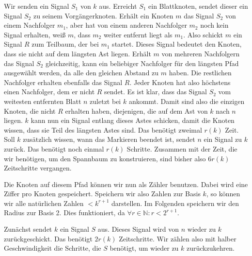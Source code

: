 \documentclass[11pt]{article}
\begin{document}
Wir senden ein Signal $S_1$ von $k$ aus. Erreicht $S_1$ ein Blattknoten, sendet dieser ein Signal $S_2$ zu seinem Vorgängerknoten. 
Erhält ein Knoten $m$ das Signal $S_2$ von einem Nachfolger $m_1$, aber hat von einem anderen Nachfolger $m_2$ noch kein Signal erhalten, weiß $m$, dass $m_2$ weiter entfernt liegt als $m_1$. 
Also schickt $m$ ein Signal $R$ zum Teilbaum, der bei $m_1$ startet. Dieses Signal bedeutet den Knoten, dass sie nicht auf dem längsten Ast liegen. 
Erhält $m$  von mehreren Nachfolgern das Signal $S_2$ gleichzeitig, kann ein beliebiger Nachfolger für den längsten Pfad ausgewählt werden, da alle den gleichen Abstand zu $m$ haben. 
Die restlichen Nachfolger erhalten ebenfalls das Signal $R$. 
Jeder Knoten hat also höchstens einen Nachfolger, dem er nicht $R$ sendet. 
Es ist klar, dass das Signal $S_2$ vom weitesten entfernten Blatt $n$ zuletzt bei $k$ ankommt. 
Damit sind also die einzigen Knoten, die nicht $R$ erhalten haben, diejenigen, die auf dem Ast von $k$ nach $n$ liegen.
$k$ kann nun ein Signal entlang dieses Astes schicken, damit die Knoten wissen, dass sie Teil des längsten Astes sind.
Das benötigt zweimal $r(k)$ Zeit. Soll $k$ zusätzlich wissen, wann das Markieren beendet ist, sendet $n$ ein Signal zu $k$ zurück. Das benötigt noch einmal $r(k)$ Schritte.
Zusammen mit der Zeit, die wir benötigen, um den Spannbaum zu konstruieren, sind bisher also $6r(k)$ Zeitschritte vergangen.

Die Knoten auf diesem Pfad können wir nun als Zähler benutzen.
Dabei wird eine Ziffer pro Knoten gespeichert. Speichern wir also Zahlen zur Basis $k$, so können wir alle natürlichen Zahlen $< k^{r+1}$ darstellen. Im Folgenden speichern wir den Radius zur Basis 2. Dies funktioniert, da $\forall r \in \mathbb{N} : r < 2^{r+1}$.

Zunächst sendet $k$ ein Signal $S$ aus. Dieses Signal wird von $n$ wieder zu $k$ zurückgeschickt. Das benötigt $2r(k)$ Zeitschritte. Wir zählen also mit halber Geschwindigkeit die Schritte, die $S$ benötigt, um wieder zu $k$ zurückzukehren.
\end{document}
